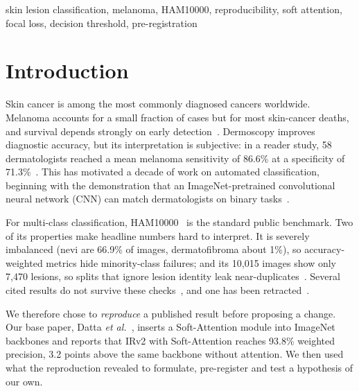\documentclass[conference]{IEEEtran}
\begin{document}
\begin{IEEEkeywords}
skin lesion classification, melanoma, HAM10000, reproducibility, soft attention, focal loss, decision threshold, pre-registration
\end{IEEEkeywords}

\section{Introduction}
Skin cancer is among the most commonly diagnosed cancers worldwide. Melanoma accounts for a small fraction of cases but for most skin-cancer deaths, and survival depends strongly on early detection~\cite{esteva2017}. Dermoscopy improves diagnostic accuracy, but its interpretation is subjective: in a reader study, 58 dermatologists reached a mean melanoma sensitivity of 86.6\% at a specificity of 71.3\%~\cite{haenssle2018}. This has motivated a decade of work on automated classification, beginning with the demonstration that an ImageNet-pretrained convolutional neural network (CNN) can match dermatologists on binary tasks~\cite{esteva2017}.

For multi-class classification, HAM10000~\cite{tschandl2018} is the standard public benchmark. Two of its properties make headline numbers hard to interpret. It is severely imbalanced (nevi are 66.9\% of images, dermatofibroma about 1\%), so accuracy-weighted metrics hide minority-class failures; and its 10,015 images show only 7,470 lesions, so splits that ignore lesion identity leak near-duplicates~\cite{abhishek2025}. Several cited results do not survive these checks~\cite{shetty2022}, and one has been retracted~\cite{densenet2}.

We therefore chose to \emph{reproduce} a published result before proposing a change. Our base paper, Datta \emph{et al.}~\cite{datta2021}, inserts a Soft-Attention module into ImageNet backbones and reports that IRv2 with Soft-Attention reaches 93.8\% weighted precision, 3.2 points above the same backbone without attention. We then used what the reproduction revealed to formulate, pre-register and test a hypothesis of our own.
\end{document}
